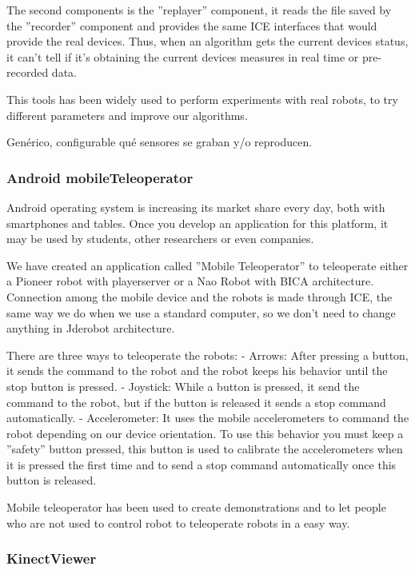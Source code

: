 \documentclass[twocolumn]{svjour3}          %
\begin{document}
The second components is the ''replayer'' component, it reads the file saved by the ''recorder'' component and provides the same ICE interfaces that would provide the real devices. Thus, when an algorithm gets the current devices status, it can't tell if it's obtaining the current devices measures in real time or pre-recorded data.

This tools has been widely used to perform experiments with real robots, to try different parameters and improve our algorithms.

Genérico, configurable qué sensores se graban y/o reproducen.

\subsubsection{Android mobileTeleoperator}

Android operating system is increasing its market share every day, both with smartphones and tables. Once you develop an application for this platform, it may be used by students, other researchers or even companies. 

We have created an application called ''Mobile Teleoperator'' to teleoperate either a Pioneer robot with playerserver or a Nao Robot with BICA architecture. Connection among the mobile device and the robots is made through ICE, the same way we do when we use a standard computer, so we don't need to change anything in Jderobot architecture.

There are three ways to teleoperate the robots:
- Arrows: After pressing a button, it sends the command to the robot and the robot keeps his behavior until the stop button is pressed.
- Joystick: While a button is pressed, it send the command to the robot, but if the button is released it sends a stop command automatically.
- Accelerometer: It uses the mobile accelerometers to command the robot depending on our device orientation. To use this behavior you must keep a ''safety'' button pressed, this button is used to calibrate the accelerometers when it is pressed the first time and to send a stop command automatically once this button is released.

Mobile teleoperator has been used to create demonstrations and to let people who are not used to control robot to teleoperate robots in a easy way.

\subsubsection{KinectViewer}
\end{document}
